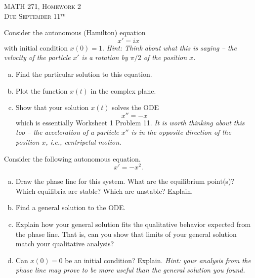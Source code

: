 \documentclass[12pt]{article} %
\begin{document}
\begin{center}
   \textsc{\large MATH 271, Homework 2}\\
   \textsc{Due September 11$^\textrm{th}$}
\end{center}
\vspace{.5cm}

\begin{problem}
Consider the autonomous (Hamilton) equation
\[
	x'=ix
\]
with initial condition $x(0)=1$. \emph{Hint: Think about what this is saying -- the velocity of the particle $x'$ is a rotation by $\pi/2$ of the position $x$.}
\begin{enumerate}[(a)]
	\item Find the particular solution to this equation.
	\item Plot the function $x(t)$ in the complex plane.
	\item Show that your solution $x(t)$ solves the ODE
	\[
		x'' = - x
	\]
	which is essentially Worksheet 1 Problem 11. \emph{It is worth thinking about this too -- the acceleration of a particle $x''$ is in the opposite direction of the position $x$, i.e., centripetal motion.}
\end{enumerate}
\end{problem}

\begin{problem} 
Consider the following autonomous equation.
    \[
    x'=-x^2.
    \]
    \begin{enumerate}[(a)]
        \item Draw the phase line for this system. What are the equilibrium point(s)? Which equilibria are stable? Which are unstable? Explain.
        \item Find a general solution to the ODE.
        \item Explain how your general solution fits the qualitative behavior expected from the phase line. That is, can you show that limits of your general solution match your qualitative analysis?
        \item Can $x(0)=0$ be an initial condition? Explain. \emph{Hint: your analysis from the phase line may prove to be more useful than the general solution you found.}
    \end{enumerate}
\end{problem}
\end{document}
